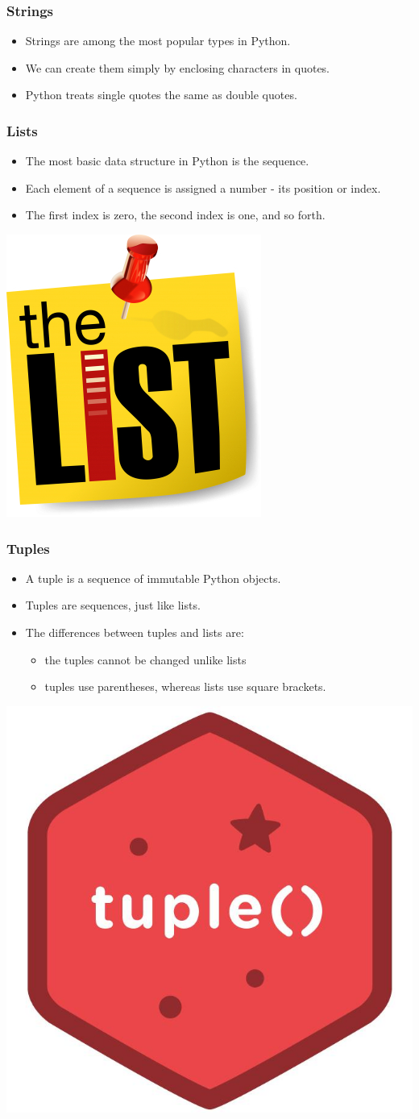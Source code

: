 \documentclass{../py-lecture}
\begin{document}
\begin{frame}
	\frametitle{Strings}
  \begin{itemize}
    \item Strings are among the most popular types in Python.
    \item We can create them simply by enclosing characters in quotes.
    \item Python treats single quotes the same as double quotes.
  \end{itemize}
\end{frame}

\begin{frame}
	\frametitle{Lists}
  \begin{itemize}
    \item The most basic data structure in Python is the sequence.
    \item Each element of a sequence is assigned a number - its position or index.
    \item The first index is zero, the second index is one, and so forth.
  \end{itemize}
	\centering\includegraphics[width=.4\textwidth]{img/list.jpg}	
\end{frame}

\begin{frame}
	\frametitle{Tuples}
  \begin{itemize}
    \item A tuple is a sequence of immutable Python objects.
    \item Tuples are sequences, just like lists.
    \item The differences between tuples and lists are:
    \begin{itemize}
        \item the tuples cannot be changed unlike lists
        \item tuples use parentheses, whereas lists use square brackets.
    \end{itemize}
  \end{itemize}
	\centering\includegraphics[width=.4\textwidth]{img/tuple.jpg}
\end{frame}
\end{document}
